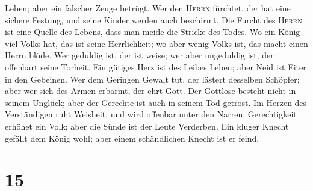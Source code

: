 Leben; aber ein falscher Zeuge betrügt.  Wer den
\textsc{Herrn} fürchtet, der hat eine sichere Festung, und seine Kinder
werden auch beschirmt.  Die Furcht des \textsc{Herrn} ist
eine Quelle des Lebens, dass man meide die Stricke des Todes.
 Wo ein König viel Volks hat, das ist seine Herrlichkeit;
wo aber wenig Volks ist, das macht einen Herrn blöde. 
Wer geduldig ist, der ist weise; wer aber ungeduldig ist, der offenbart
seine Torheit.  Ein gütiges Herz ist des Leibes Leben;
aber Neid ist Eiter in den Gebeinen.  Wer dem Geringen
Gewalt tut, der lästert desselben Schöpfer; aber wer sich des Armen
erbarmt, der ehrt Gott.  Der Gottlose besteht nicht in
seinem Unglück; aber der Gerechte ist auch in seinem Tod getrost.
 Im Herzen des Verständigen ruht Weisheit, und wird
offenbar unter den Narren.  Gerechtigkeit erhöhet ein
Volk; aber die Sünde ist der Leute Verderben.  Ein kluger
Knecht gefällt dem König wohl; aber einem schändlichen Knecht ist er
feind.

\hypertarget{section-14}{%
\section{15}\label{section-14}}

